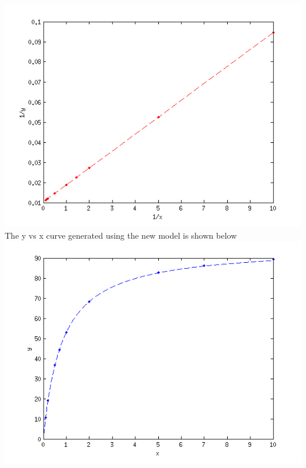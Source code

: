 \documentclass[a4paper,12pt]{article}
\begin{document}
\includegraphics [keepaspectratio=true] {prob21.png}
\\
The y vs x curve generated using the new model is shown below\\
\includegraphics [keepaspectratio=true] {prob22.png}
\end{document}
